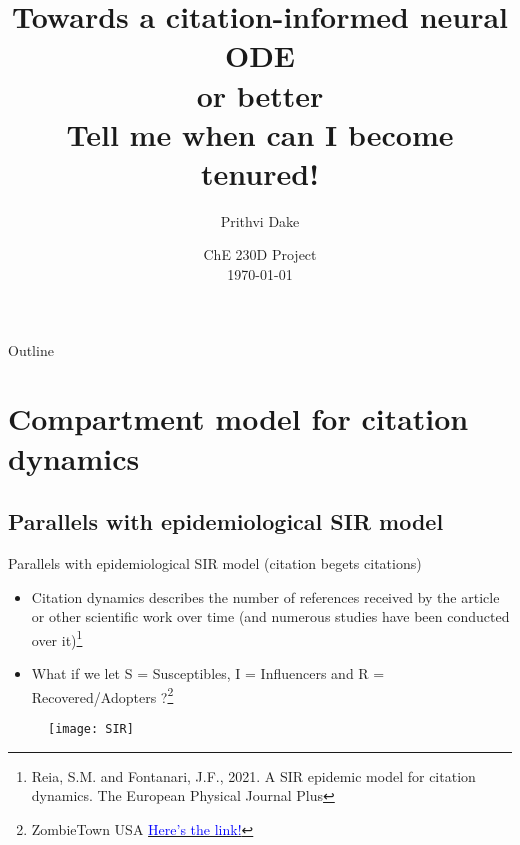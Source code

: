 \documentclass[dvipsnames, 9pt]{beamer}
\title[Citation informed NODE]{Towards a citation-informed neural ODE \\ or better \\ \textbf{Tell me when can I become tenured!}}
\author[ChE230D---Dake]{Prithvi Dake}
\institute [UCSB]{Department of Chemical
  Engineering\\
    \pgfuseimage{ucsb-logo}}
\date{ChE 230D Project \\
\today}
\begin{document}
\frame{\titlepage}




\begin{frame}{Outline} 
\tableofcontents
\end{frame}

\section{Compartment model for citation dynamics}
\subsection{Parallels with epidemiological SIR model}
\begin{frame}{Parallels with epidemiological SIR model \small{(citation begets citations)}}
\begin{itemize}
\item Citation dynamics describes the number of references received by the article or other scientific work over time (and numerous studies have been conducted over it)\footnote{\tiny{Reia, S.M. and Fontanari, J.F., 2021. A SIR epidemic model for citation dynamics. The European Physical Journal Plus}}
\item What if we let S = Susceptibles, I = Influencers and R = Recovered/Adopters ?\footnote{\tiny {ZombieTown USA \href{https://mattbierbaum.github.io/zombies-usa}{\textcolor{blue}{Here's the link!}}}}
\end{itemize}
\begin{figure}[H]
\centering
\texttt{[image: SIR]}
\end{figure}
\end{frame}
\end{document}
